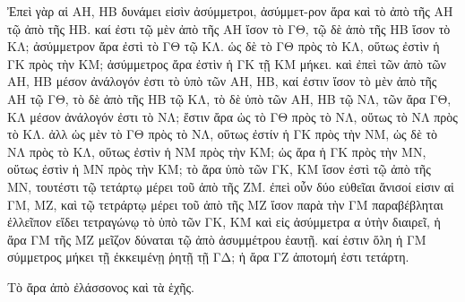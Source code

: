 \begin{Parallel}{}{}
{{\greekfont Ἐπεὶ γὰρ αἱ ΑΗ, ΗΒ δυνάμει εἰσὶν ἀσύμμετροι, ἀσύμμετ-ρον
ἄρα καὶ τὸ ἀπὸ τῆς ΑΗ τῷ ἀπὸ τῆς ΗΒ.  καί ἐστι τῷ μὲν
ἀπὸ τῆς ΑΗ ἴσον τὸ ΓΘ, τῷ δὲ ἀπὸ τῆς ΗΒ ἴσον
τὸ ΚΛ; ἀσύμμετρον ἄρα ἐστὶ τὸ ΓΘ τῷ ΚΛ. ὡς δὲ τὸ ΓΘ πρὸς
τὸ ΚΛ, οὕτως ἐστὶν ἡ ΓΚ πρὸς τὴν ΚΜ; ἀσύμμετρος ἄρα ἐστὶν
ἡ ΓΚ τῇ ΚΜ μήκει. καὶ ἐπεὶ τῶν ἀπὸ τῶν ΑΗ, ΗΒ μέσον ἀνάλογόν ἐστι τὸ ὑπὸ τῶν ΑΗ, ΗΒ, καί ἐστιν ἴσον τὸ
μὲν ἀπὸ τῆς ΑΗ τῷ ΓΘ, τὸ δὲ ἀπὸ τῆς ΗΒ τῷ ΚΛ, τὸ δὲ ὑπὸ
τῶν ΑΗ, ΗΒ τῷ ΝΛ, τῶν ἄρα ΓΘ, ΚΛ μέσον ἀνάλογόν ἐστι
τὸ ΝΛ; ἔστιν ἄρα ὡς τὸ ΓΘ πρὸς τὸ ΝΛ, οὕτως τὸ ΝΛ πρὸς
τὸ ΚΛ. ἀλλ ὡς μὲν τὸ ΓΘ πρὸς τὸ ΝΛ, οὕτως ἐστίν ἡ ΓΚ
πρὸς τὴν ΝΜ, ὡς δὲ τὸ ΝΛ πρὸς τὸ ΚΛ, οὕτως ἐστὶν ἡ ΝΜ
πρὸς τὴν ΚΜ; ὡς ἄρα ἡ ΓΚ πρὸς τὴν ΜΝ, οὕτως ἐστὶν
ἡ ΜΝ πρὸς τὴν ΚΜ; τὸ ἄρα ὑπὸ τῶν ΓΚ, ΚΜ ἴσον ἐστὶ
τῷ ἀπὸ τῆς ΜΝ, τουτέστι τῷ τετάρτῳ μέρει τοῦ ἀπὸ τῆς
ΖΜ. ἐπεὶ οὖν δύο εὐθεῖαι ἄνισοί εἰσιν αἱ ΓΜ, ΜΖ, καὶ
τῷ τετράρτῳ μέρει τοῦ ἀπὸ τῆς ΜΖ ἴσον παρὰ τὴν ΓΜ παραβέβληται
ἐλλεῖπον εἴδει τετραγώνῳ τὸ ὑπὸ τῶν ΓΚ, ΚΜ καὶ
εἰς ἀσύμμετρα α ὐτὴν διαιρεῖ, ἡ ἄρα ΓΜ τῆς ΜΖ μεῖζον
δύναται τῷ ἀπὸ ἀσυμμέτρου ἑαυτῇ. καί ἐστιν ὅλη
ἡ ΓΜ σύμμετρος μήκει τῇ ἐκκειμένῃ ῥητῇ τῇ ΓΔ;
ἡ ἄρα ΓΖ ἀποτομή ἐστι τετάρτη.}

{\greekfont Τὸ ἄρα ἀπὸ ἐλάσσονος καὶ τὰ ἑχῆς.}}

\end{Parallel}
